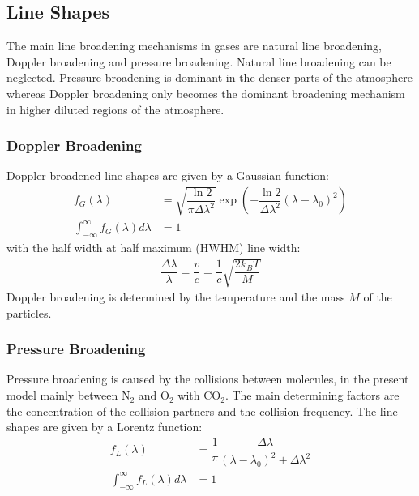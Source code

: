 \subsection{Line Shapes}

The main line broadening mechanisms in gases are natural line broadening, Doppler broadening and pressure broadening. Natural line broadening can be neglected. Pressure broadening is dominant in the denser parts of the atmosphere whereas Doppler broadening only becomes the dominant broadening mechanism in higher diluted regions of the atmosphere.

\subsubsection{Doppler Broadening}

Doppler broadened line shapes are given by a Gaussian function:
\begin{align}
	f_G(\lambda) &= \sqrt{\dfrac{\ln 2}{\pi \Delta \lambda^2}}
		\exp \left(- \dfrac{\ln 2}{\Delta \lambda^2}  \left(\lambda - \lambda_0\right)^2 \right) \\
			\int_{-\infty}^{\infty}  f_G(\lambda) d\lambda &= 1
\end{align}
with the half width at half maximum (HWHM) line width:
\begin{align}
\dfrac{\Delta \lambda}{\lambda} = \dfrac{v}{c} = \dfrac{1}{c} \sqrt{\dfrac{2 k_B T}{M}}
\end{align}
Doppler broadening is  determined by the temperature and the mass $M$ of the particles.

\subsubsection{Pressure Broadening}

Pressure broadening is caused by the collisions between molecules, in the present model mainly between $\mathrm{N}_2$ and $\mathrm{O}_2$ with $\mathrm{CO}_2$. 
The main determining factors are the concentration of the collision partners and the collision frequency. The line shapes are given by a Lorentz function:
\begin{align}
	f_L(\lambda) &= \dfrac{1}{\pi} \dfrac{\Delta \lambda}{ (\lambda - \lambda_0)^2 + \Delta \lambda^2} \\
	\int_{-\infty}^{\infty}  f_L(\lambda) d\lambda &= 1
\end{align}

